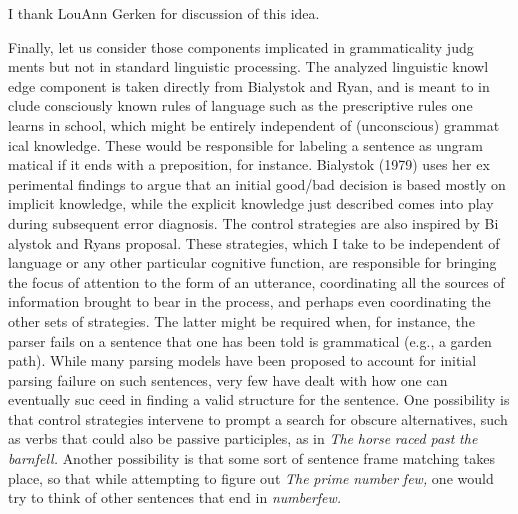 \begin{listWWNumxxileveli}
\item 
\setcounter{listWWNumxxilevelii}{0}
\begin{listWWNumxxilevelii}
\item 
\setcounter{listWWNumxxileveliii}{0}
\begin{listWWNumxxileveliii}
\item 
\setcounter{listWWNumxxileveliv}{0}
\begin{listWWNumxxileveliv}
\item 
\begin{styleStandard}
I thank LouAnn Gerken for discussion of this idea.
\end{styleStandard}


\end{listWWNumxxileveliv}
\end{listWWNumxxileveliii}
\end{listWWNumxxilevelii}
\end{listWWNumxxileveli}
\clearpage\setcounter{page}{1}\begin{styleTextbody}
Finally, let us consider those components implicated in grammaticality judg\- ments but not in standard linguistic processing. The analyzed linguistic knowl\- edge component is taken directly from Bialystok and Ryan, and is meant to in\- clude consciously known rules of language such as the prescriptive rules one learns in school, which might be entirely independent of (unconscious) grammat\- ical knowledge. These would be responsible for labeling a sentence as ungram\- matical if it ends with a preposition, for instance. Bialystok (1979) uses her ex\- perimental findings to argue that an initial good/bad decision is based mostly on implicit knowledge, while the explicit knowledge just described comes into play during subsequent error diagnosis. The control strategies are also inspired by Bi\- alystok and Ryan{\textquotesingle}s proposal. These strategies, which I take to be independent of language or any other particular cognitive function, are responsible for bringing the focus of attention to the form of an utterance, coordinating all the sources of information brought to bear in the process, and perhaps even coordinating the other sets of strategies. The latter might be required when, for instance, the parser fails on a sentence that one has been told is grammatical (e.g., a garden path). While many parsing models have been proposed to account for initial parsing failure on such sentences, very few have dealt with how one can eventually suc\- ceed in finding a valid structure for the sentence. One possibility is that control strategies intervene to prompt a search for obscure alternatives, such as verbs that could also be passive participles, as in \textit{The}\textit{ }\textit{horse}\textit{ }\textit{raced}\textit{ }\textit{past}\textit{ }\textit{the}\textit{ }\textit{barnfell.}\textit{ }Another possibility is that some sort of sentence frame matching takes place, so that while attempting to figure out \textit{The}\textit{ }\textit{prime}\textit{ }\textit{number}\textit{ }\textit{few,}\textit{ }one would try to think of other sentences that end in \textit{numberfew.}
\end{styleTextbody}


